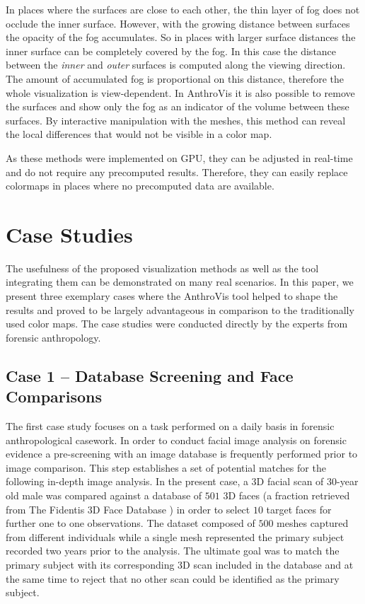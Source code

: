 \documentclass[final,5p,times]{elsarticle}
\begin{document}
\begin{itemize}
In places where the surfaces are close to each other, the thin layer of fog does not occlude the inner surface.
However, with the growing distance between surfaces the opacity of the fog accumulates.
So in places with larger surface distances the inner surface can be completely covered by the fog. 
In this case the distance between the \textit{inner} and \textit{outer} surfaces is computed along the viewing direction.
The amount of accumulated fog is proportional on this distance, therefore the whole visualization is view-dependent.
In AnthroVis it is also possible to remove the surfaces and show only the fog as an indicator of the volume between these surfaces. 
By interactive manipulation with the meshes, this method can reveal the local differences that would not be visible in a color map.
\end{itemize}
As these methods were implemented on GPU, they can be adjusted in real-time and do not require any precomputed results.
Therefore, they can easily replace colormaps in places where no precomputed data are available.

\section{Case Studies} \label{results}
The usefulness of the proposed visualization methods as well as the tool integrating them can be demonstrated on many real scenarios.
In this paper, we present three exemplary cases where the AnthroVis tool helped to shape the results and proved to be largely advantageous in comparison to the traditionally used color maps.
The case studies were conducted directly by the experts from forensic anthropology.

\subsection{Case 1 -- Database Screening and Face Comparisons}
The first case study focuses on a task performed on a daily basis in forensic anthropological casework. 
In order to conduct facial image analysis on forensic evidence a pre-screening with an image database is frequently performed prior to image comparison. 
This step establishes a set of potential matches for the following in-depth image analysis.
In the present case, a 3D facial scan of $30$-year old male was compared against a database of $501$ 3D faces (a fraction retrieved from The Fidentis 3D Face Database \cite{F3DFD}) in order to select $10$ target faces for further one to one observations.
The dataset composed of $500$ meshes captured from different individuals while a single mesh represented the primary subject recorded two years prior to the analysis. The ultimate goal was to match the primary subject with its corresponding 3D scan included in the database and at the same time to reject that no other scan could be identified as the primary subject. 
\end{document}
